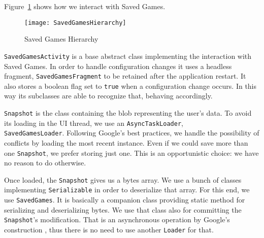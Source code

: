 Figure~\ref{fig:saved-games-hierarchy} shows how we interact with Saved Games.
\begin{figure}
	\centering
	\texttt{[image: SavedGamesHierarchy]}
	\caption{Saved Games Hierarchy}
	\label{fig:saved-games-hierarchy}
\end{figure}

\texttt{SavedGamesActivity} is a base abstract class implementing the interaction with Saved Games. In order to handle configuration changes it uses a headless fragment, \texttt{SavedGamesFragment} to be retained after the application restart. It also stores a boolean flag set to \texttt{true} when a configuration change occurs. In this way its subclasses are able to recognize that, behaving accordingly. 

\texttt{Snapshot} is the class containing the blob representing the user's data. To avoid its loading in the UI thread, we use an \texttt{AsyncTaskLoader}, \\\texttt{SavedGamesLoader}. Following Google's best practices, we handle the possibility of conflicts by loading the most recent instance. Even if we could save more than one \texttt{Snapshot}, we prefer storing just one. This is an opportunistic choice: we have no reason to do otherwise.

Once loaded, the \texttt{Snapshot} gives us a bytes array. We use a bunch of classes implementing \texttt{Serializable} in order to deserialize that array. For this end, we use \texttt{SavedGames}. It is basically a companion class providing static method for serializing and deserializing bytes. We use that class also for committing the \texttt{Snapshot}'s modification. That is an asynchronous operation by Google's construction , thus there is no need to use another \texttt{Loader} for that.